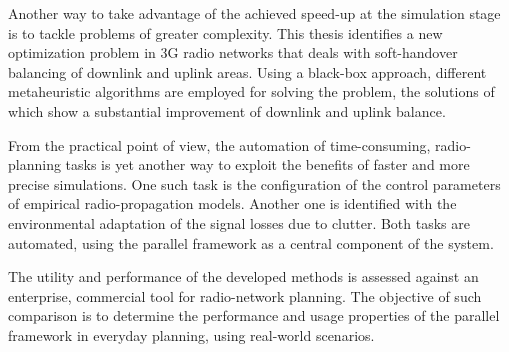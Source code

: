 Another way to take advantage of the achieved speed-up at the simulation
stage is to tackle problems of greater complexity. This thesis identifies
a new optimization problem in 3G radio networks that deals with soft-handover
balancing of downlink and uplink areas. Using a black-box approach,
different metaheuristic algorithms are employed for solving the problem,
the solutions of which show a substantial improvement of downlink
and uplink balance.

From the practical point of view, the automation of time-consuming,
radio-planning tasks is yet another way to exploit the benefits of
faster and more precise simulations. One such task is the configuration
of the control parameters of empirical radio-propagation models. Another
one is identified with the environmental adaptation of the signal
losses due to clutter. Both tasks are automated, using the parallel
framework as a central component of the system.

The utility and performance of the developed methods is assessed against
an enterprise, commercial tool for radio-network planning. The objective
of such comparison is to determine the performance and usage properties
of the parallel framework in everyday planning, using real-world scenarios.


